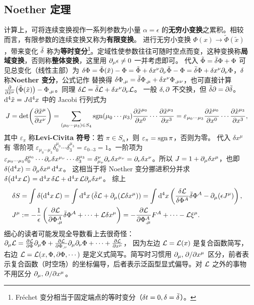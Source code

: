 \subsection{Noether 定理}\label{sec:Noe}
计算上，可将连续变换视作一系列参数为小量 $\alpha=\epsilon$ 的\textbf{无穷小变换}之累积。相较而言，有限参数的连续变换又称为\textbf{有限变换}。
进行无穷小变换 $\Phi(x)\to\tilde\Phi(\tilde x)$，带来变化
$\bar\var$ 称为\textbf{等时变分}\footnote{Fréchet 变分相当于固定端点的等时变分（$\delta t=0,\var=\bar\var$）。}。定域性使参数往往可随时空点而变，这种变换称\textbf{局域变换}，否则称\textbf{整体变换}，这里用 $\partial_\mu\epsilon\ne 0$ 一并考虑即可。
代入 $\tilde\Phi=\bar\var\Phi+\Phi$ 可见总变化（线性主部）为 $\var \Phi=\tilde\Phi(\tilde x)- \Phi=\tilde\Phi + \var x^\nu\partial_\nu\tilde{\Phi} - \Phi=\bar\var\Phi+\var x^\nu\partial_\nu\Phi$，$\var$ 称\textbf{Noether 变分}，公式记作
替换得 $\delta\Phi_{,\mu}=\bar\var\Phi_{,\mu}+ \delta x^\nu\Phi_{,\mu\nu}$，也可直接计算 $\pdv{\tilde x^\mu}(\tilde \Phi(\tilde x))-\Phi_{,\mu}$。同理 $\delta\mathcal{L}=\bar\var\mathcal{L}+\delta x^\nu\partial_\nu\mathcal{L}$。
一般 $\var,\partial$ 不交换，但 $\bar\var\partial =\partial\bar\var$。
$\dd[4]\tilde x=J\dd[4]x$ 中的 Jacobi 行列式为
\[
J=\det(\pdv{\tilde x^\mu}{x^\nu})=\sum_{(\mu_0\cdots \mu_3)\in S_4}\operatorname{sgn}(\mu_0\cdots \mu_3)\pdv{\tilde x^{\mu_0}}{x^0}\cdots\pdv{\tilde x^{\mu_3}}{x^3}=\varepsilon_{\mu_0\cdots \mu_3}\pdv{\tilde x^{\mu_0}}{x^0}\cdots\pdv{\tilde x^{\mu_3}}{x^3},
\]
其中 $\varepsilon_{\pi}$ 称\textbf{Levi-Civita 符号}：若 $\pi\in S_n$，则 $\varepsilon_{\pi}=\operatorname{sgn} \pi$，否则为零。
代入 $\delta x^\mu$ 有
零阶项 $\varepsilon_{\mu_0\cdots \mu_3} \delta_0^{\mu_0}\cdots\delta_3^{\mu_3}=\varepsilon_{0\cdots 3}=1$。一阶项为 $\varepsilon_{\mu_0\cdots \mu_3}\delta_0^{\mu_0}\cdots\partial_\nu\delta x^{\mu_\nu}\cdots\delta_3^{\mu_3}=\delta_{\mu_\nu}^{\nu}\partial_\nu\delta x^{\mu_\nu}=\partial_\nu\delta x^\nu$。所以 $J=1+\partial_\mu\delta x^\mu$，也即 $\delta(\dd[4]{x})=\partial_\mu\delta x^\mu\dd[4]{x}$。
这相当于将 Noether 变分挪进积分并求 $\var(\dd[4]{x}\mathcal{L}) = \dd[4]{x}\var\mathcal{L} + \dd[4]{x}\mathcal{L}\partial_\mu\delta x^\mu$。
综上
\begin{align*}
    \delta S &=\int \delta(\d[4]{x}\Lag)=\int \d[4]{x} (\bar\var\Lag+\p_\mu(\Lag\delta x^\mu))=\int\d[4]{x}\left(\fdv{\Lag}{\Phi^A}\bar\var\Phi^A - \p_\mu(\epsilon J^\mu)\right),\\
    J^\mu &:=-\frac{1}{\epsilon}\left(\pdv{\Lag}{\Phi^A_{,\mu}}\bar\var\Phi^A+\cdots+\Lag\delta x^\mu\right)=-\pdv{\Lag}{\Phi^A_{,\mu}} F^A+\cdots-\Lag \xi^\mu.
\end{align*}
细心的读者可能发现全导数看上去很奇怪：$\partial_\mu\mathcal{L} = \pdv{\mathcal{L}}{\Phi}\partial_\mu\Phi + \pdv{\mathcal{L}}{\Phi_{,\nu}}\partial_\mu\partial_\nu\Phi + \cdots + \pdv{\mathcal{L}}{x^\mu}$，
因为左边 $\mathcal{L}=\mathcal{L}(x)$ 是复合函数简写，右边 $\mathcal{L}=\mathcal{L}(x,\Phi,\partial\Phi,\cdots)$ 是定义式简写。简写时习惯用 $\partial_\mu,\pdv*{x^\mu}$ 区分，前者表示复合函数（时空场）的坐标偏导，后者表示泛函型显式偏导。对 $\mathcal{L}$ 之外的事物不用区分 $\partial_\mu,\pdv*{x^\mu}$。




